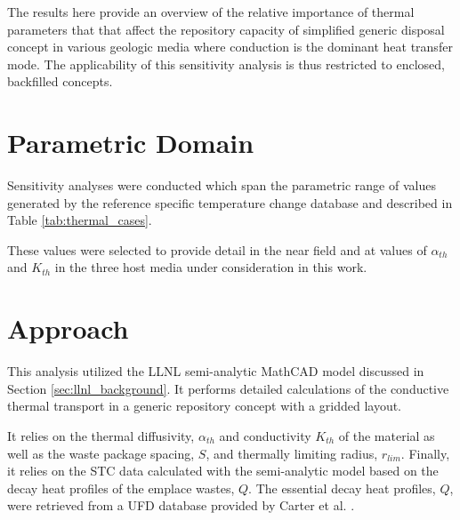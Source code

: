 
The results here provide an overview of the relative importance of thermal
parameters that that affect the repository capacity of simplified generic
disposal concept in various geologic media where conduction is the dominant
heat transfer mode. The applicability of this sensitivity analysis is thus
restricted to enclosed, backfilled concepts.  

\section{Parametric Domain}

Sensitivity analyses were conducted which span the parametric range of values 
generated by the reference specific temperature change database and described 
in Table \ref{tab:thermal_cases}.  



These values were selected to provide detail in the near field and at values of
$\alpha_{th}$ and $K_{th}$ in the three host media under consideration in this
work.

\section{Approach}

This analysis utilized the \gls{LLNL} semi-analytic MathCAD model
discussed in Section \ref{sec:llnl_background}.  It performs detailed
calculations of the conductive thermal transport in a generic repository
concept with a gridded layout.  

It relies on the thermal diffusivity, $\alpha_{th}$ and conductivity $K_{th}$ of 
the material as well as the waste package spacing, $S$, and thermally limiting 
radius, $r_{lim}$. Finally, it relies on the \gls{STC} data calculated with the 
semi-analytic model based on the decay heat profiles of the emplace wastes, $Q$. 
The essential decay heat profiles, $Q$, were retrieved from a \gls{UFD} database 
provided by Carter et al. \cite{carter_fuel_2011}.


